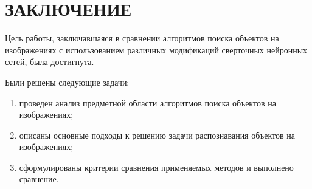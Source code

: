 \chapter*{ЗАКЛЮЧЕНИЕ}

Цель работы, заключавшаяся в сравнении алгоритмов поиска объектов на изображениях с использованием различных модификаций сверточных нейронных сетей, была достигнута.

Были решены следующие задачи:
\begin{enumerate}[leftmargin=1.6\parindent]
	\item проведен анализ предметной области алгоритмов поиска объектов на изображениях;
	\item описаны основные подходы к решению задачи распознавания объектов на изображениях;
	\item сформулированы критерии сравнения применяемых методов и выполнено сравнение.
\end{enumerate}